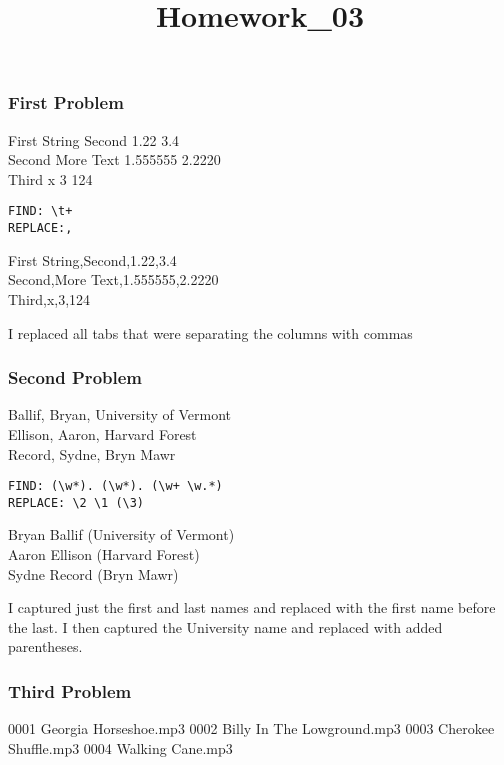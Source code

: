 \documentclass[
]{article}
\title{Homework\_03}
\author{}
\date{\vspace{-2.5em}}
\begin{document}
\maketitle

\hypertarget{first-problem}{%
\subsubsection{First Problem}\label{first-problem}}

First String Second 1.22 3.4\\
Second More Text 1.555555 2.2220\\
Third x 3 124

\begin{verbatim}
FIND: \t+
REPLACE:,
\end{verbatim}

First String,Second,1.22,3.4\\
Second,More Text,1.555555,2.2220\\
Third,x,3,124

I replaced all tabs that were separating the columns with commas

\hypertarget{second-problem}{%
\subsubsection{Second Problem}\label{second-problem}}

Ballif, Bryan, University of Vermont\\
Ellison, Aaron, Harvard Forest\\
Record, Sydne, Bryn Mawr

\begin{verbatim}
FIND: (\w*). (\w*). (\w+ \w.*)
REPLACE: \2 \1 (\3)
\end{verbatim}

Bryan Ballif (University of Vermont)\\
Aaron Ellison (Harvard Forest)\\
Sydne Record (Bryn Mawr)

I captured just the first and last names and replaced with the first
name before the last. I then captured the University name and replaced
with added parentheses.

\hypertarget{third-problem}{%
\subsubsection{Third Problem}\label{third-problem}}

0001 Georgia Horseshoe.mp3 0002 Billy In The Lowground.mp3 0003 Cherokee
Shuffle.mp3 0004 Walking Cane.mp3
\end{document}
